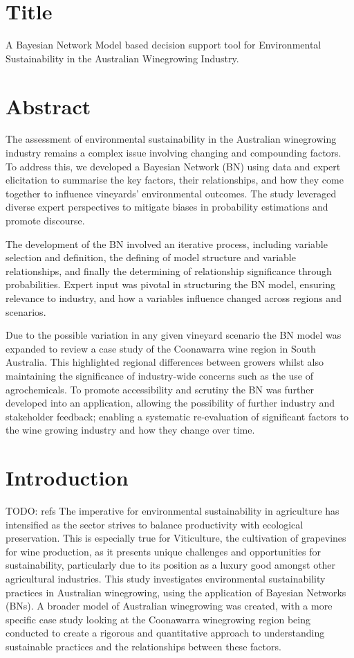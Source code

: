\section{Title}
A Bayesian Network Model based decision support tool for Environmental Sustainability in the Australian Winegrowing Industry.

\section{Abstract}

The assessment of environmental sustainability in the Australian winegrowing industry remains a complex issue involving changing and compounding factors. To address this, we developed a Bayesian Network (BN) using data and expert elicitation to summarise the key factors, their relationships, and how they come together to influence vineyards' environmental outcomes. The study leveraged diverse expert perspectives to mitigate biases in probability estimations and promote discourse.

The development of the BN involved an iterative process, including variable selection and definition, the defining of model structure and variable relationships, and finally the determining of relationship significance through probabilities. Expert input was pivotal in structuring the BN model, ensuring relevance to industry, and how a variables influence changed across regions and scenarios.

Due to the possible variation in any given vineyard scenario the BN model was expanded to review a case study of the Coonawarra wine region in South Australia. This highlighted regional differences between growers whilst also maintaining the significance of industry-wide concerns such as the use of agrochemicals. To promote accessibility and scrutiny the BN was further developed into an application, allowing the possibility of further industry and stakeholder feedback; enabling a systematic re-evaluation of significant factors to the wine growing industry and how they change over time.

\section{Introduction}
TODO: refs
The imperative for environmental sustainability in agriculture has intensified as the sector strives to balance productivity with ecological preservation. This is especially true for Viticulture, the cultivation of grapevines for wine production, as it presents unique challenges and opportunities for sustainability, particularly due to its position as a luxury good amongst other agricultural industries. This study investigates environmental sustainability practices in Australian winegrowing, using the application of Bayesian Networks (BNs). A broader model of Australian winegrowing was created, with a more specific case study looking at the Coonawarra winegrowing region being conducted to create a rigorous and quantitative approach to understanding sustainable practices and the relationships between these factors.

